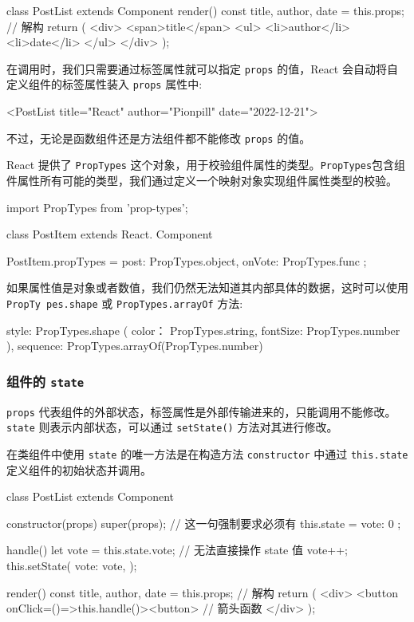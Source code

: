 \begin{JavaScript}
class PostList extends Component {
  render() {
    const {title, author, date} = this.props;   // 解构
    return (
      <div>
        <span>{title}</span>
        <ul>
          <li>{author}</li>
          <li>{date}</li>
        </ul>
      </div>
    );
  }
}
\end{JavaScript}

在调用时，我们只需要通过标签属性就可以指定 \texttt{props} 的值，React 会自动将自定义组件的标签属性装入 \texttt{props} 属性中:

\begin{HTML}
<PostList title="React" author="Pionpill" date="2022-12-21">
\end{HTML}

不过，无论是函数组件还是方法组件都不能修改 \texttt{props} 的值。

React 提供了 \texttt{PropTypes} 这个对象，用于校验组件属性的类型。\texttt{PropTypes}包含组件属性所有可能的类型，我们通过定义一个映射对象实现组件属性类型的校验。

\begin{JavaScript}
import PropTypes from 'prop-types';

class PostItem extends React. Component{}

PostItem.propTypes = {
  post: PropTypes.object,
  onVote: PropTypes.func
};
\end{JavaScript}

如果属性值是对象或者数值，我们仍然无法知道其内部具体的数据，这时可以使用 \texttt{PropTy pes.shape} 或 \texttt{PropTypes.arrayOf} 方法:

\begin{JavaScript}
style: PropTypes.shape ({
  color： PropTypes.string,
  fontSize: PropTypes.number
}),
sequence: PropTypes.arrayOf(PropTypes.number) 
\end{JavaScript}

\subsubsection{组件的 \texttt{state}}

\texttt{props} 代表组件的外部状态，标签属性是外部传输进来的，只能调用不能修改。\texttt{state} 则表示内部状态，可以通过 \texttt{setState()} 方法对其进行修改。

在类组件中使用 \texttt{state} 的唯一方法是在构造方法 \texttt{constructor} 中通过 \texttt{this.state} 定义组件的初始状态并调用。

\begin{JavaScript}
class PostList extends Component {
  constructor(props) {
    super(props);   // 这一句强制要求必须有
    this.state = {
      vote: 0
    };
  }

  handle() {
    let vote = this.state.vote; // 无法直接操作 state 值
    vote++;
    this.setState({
      vote: vote,
    });
  }

  render() {
    const {title, author, date} = this.props;   // 解构
    return (
      <div>
        <button onClick={()=>this.handle()}><button>  // 箭头函数
      </div>
    );
  }
}
\end{JavaScript}

